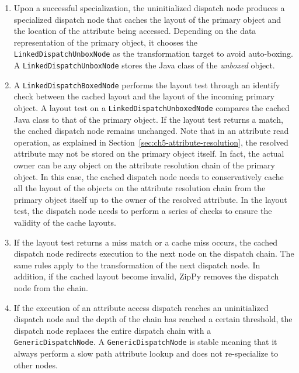 \begin{enumerate}

\item Upon a successful specialization, the uninitialized dispatch node produces a specialized dispatch node that caches the layout of the primary object and the location of the attribute being accessed.
Depending on the data representation of the primary object, it chooses the \texttt{LinkedDispatchUnboxNode} as the transformation target to avoid auto-boxing.
A \texttt{LinkedDispatchUnboxNode} stores the Java class of the \emph{unboxed} object.

\item A \texttt{LinkedDispatchBoxedNode} performs the layout test through an identify check between the cached layout and the layout of the incoming primary object.
A layout test on a \texttt{LinkedDispatchUnboxedNode} compares the cached Java class to that of the primary object.
If the layout test returns a match, the cached dispatch node remains unchanged.
Note that in an attribute read operation, as explained in Section~\ref{sec:ch5-attribute-resolution}, the resolved attribute may not be stored on the primary object itself.
In fact, the actual owner can be any object on the attribute resolution chain of the primary object.
In this case, the cached dispatch node needs to conservatively cache all the layout of the objects on the attribute resolution chain from the primary object itself up to the owner of the resolved attribute.
In the layout test, the dispatch node needs to perform a series of checks to ensure the validity of the cache layouts.

\item If the layout test returns a miss match or a cache miss occurs, the cached dispatch node redirects execution to the next node on the dispatch chain.
The same rules apply to the transformation of the next dispatch node.
In addition, if the cached layout become invalid, ZipPy removes the dispatch node from the chain.

\item If the execution of an attribute access dispatch reaches an uninitialized dispatch node and the depth of the chain has reached a certain threshold,
the dispatch node replaces the entire dispatch chain with a \texttt{GenericDispatchNode}.
A \texttt{GenericDispatchNode} is stable meaning that it always perform a slow path attribute lookup and does not re-specialize to other nodes.

\end{enumerate}

